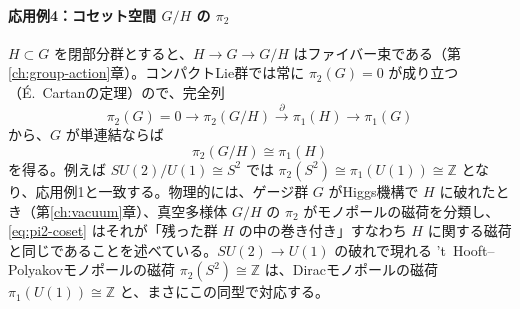 \documentclass[uplatex, dvipdfmx, book]{jsbook}
\begin{document}
\paragraph{応用例4：コセット空間 $G/H$ の $\pi_2$}
$H \subset G$ を閉部分群とすると、$H \to G \to G/H$ はファイバー束である（第\ref{ch:group-action}章）。コンパクトLie群では常に $\pi_2(G) = 0$ が成り立つ（É.~Cartanの定理）ので、完全列
\begin{equation*}
    \pi_2(G) = 0 \to \pi_2(G/H) \xrightarrow{\ \partial\ } \pi_1(H) \to \pi_1(G)
\end{equation*}
から、$G$ が単連結ならば
\begin{equation}
    \pi_2(G/H) \cong \pi_1(H)
    \label{eq:pi2-coset}
\end{equation}
を得る。例えば $SU(2)/U(1) \cong S^2$ では $\pi_2(S^2) \cong \pi_1(U(1)) \cong \mathbb{Z}$ となり、応用例1と一致する。物理的には、ゲージ群 $G$ がHiggs機構で $H$ に破れたとき（第\ref{ch:vacuum}章）、真空多様体 $G/H$ の $\pi_2$ がモノポールの磁荷を分類し、\eqref{eq:pi2-coset} はそれが「残った群 $H$ の中の巻き付き」すなわち $H$ に関する磁荷と同じであることを述べている。$SU(2) \to U(1)$ の破れで現れる 't~Hooft--Polyakovモノポールの磁荷 $\pi_2(S^2) \cong \mathbb{Z}$ は、Diracモノポールの磁荷 $\pi_1(U(1)) \cong \mathbb{Z}$ と、まさにこの同型で対応する。
\end{document}
